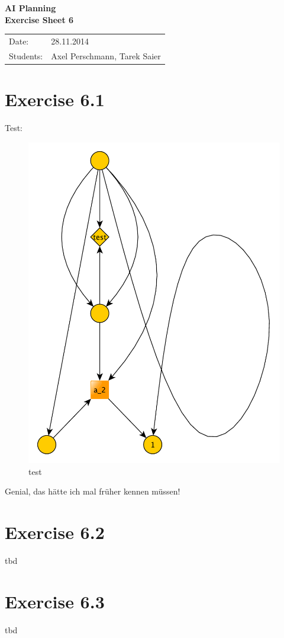 \documentclass[11pt,a4paper]{article}
\begin{document}
\begin{center}
\Huge{\textbf{AI Planning}}\\
\LARGE{\textbf{Exercise Sheet 6}}
\end{center}
\vspace{2cm}
\begin{tabular}{ll}
Date: & 28.11.2014\\
Students: & Axel Perschmann, Tarek Saier
\end{tabular}

\section*{Exercise 6.1}
Test:\\
\begin{figure}[h!]
\caption{test}
\centering
\includegraphics[scale=0.4]{test}
\end{figure}

Genial, das hätte ich mal früher kennen müssen!

\section*{Exercise 6.2}
tbd

\section*{Exercise 6.3}
tbd
\end{document}
